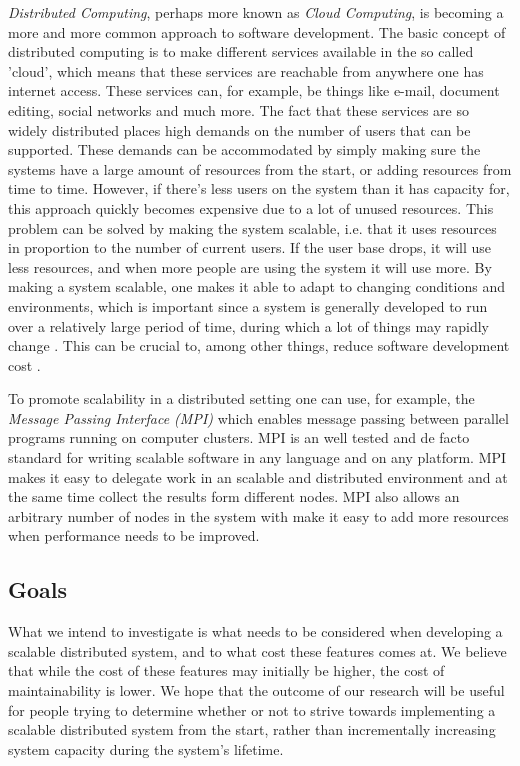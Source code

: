 \documentclass{article}
\begin{document}
\emph{Distributed Computing}, perhaps more known as \emph{Cloud Computing}, is becoming a
more and more common approach to software development. The basic concept of
distributed computing is to make different services available in the so called
'cloud', which means that these services are reachable from anywhere one has
internet access. These services can, for example, be things like e-mail,
document editing, social networks and much more. The fact that these services
are so widely distributed places high demands on the number of users that can
be supported. These demands can be accommodated by simply making sure the
systems have a large amount of resources from the start, or adding resources
from time to time. However, if there's less users on the system than it has
capacity for, this approach quickly becomes expensive due to a lot of unused
resources. This problem can be solved by making the system scalable, i.e. that
it uses resources in proportion to the number of current users. If the user
base drops, it will use less resources, and when more people are using the
system it will use more. By making a system scalable, one makes it able to
adapt to changing conditions and environments, which is important since a
system is generally developed to run over a relatively large period of time,
during which a lot of things may rapidly change \cite{van1998software}
\cite{caruso1997toward}. This can be crucial to, among other things, reduce
software development cost \cite{fayad2005towards}.

To promote scalability in a distributed setting one can use, for example, the
\emph{Message Passing Interface (MPI)} which enables message passing between
parallel programs running on computer clusters. MPI is
an well tested and de facto standard for writing scalable software in any
language and on any platform. MPI makes it easy to delegate work in an
scalable and distributed environment and at the same time collect the results
form different nodes. MPI also allows an arbitrary number of nodes in the 
system with make it easy to add more resources when performance needs to
be improved. \cite{gropp1996high}
 
\subsection{Goals} 

What we intend to investigate is what needs to be considered
when developing a scalable distributed system, and to what cost these features
comes at. We believe that while the cost of these features may initially be
higher, the cost of maintainability is lower. We hope that the outcome of our
research will be useful for people trying to determine whether or not to strive
towards implementing a scalable distributed system from the start, rather than
incrementally increasing system capacity during the system's lifetime.
\end{document}
